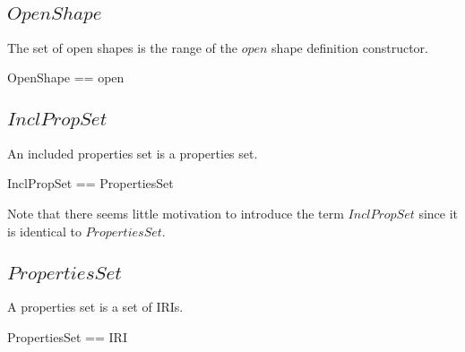 \documentclass{article}
\begin{document}
\subsection{$OpenShape$}
The set of open shapes is the range of the $open$ shape definition constructor.
\begin{zed}
	OpenShape == \ran open
\end{zed}

\subsection{$InclPropSet$}
An included properties set is a properties set.
\begin{zed}
	InclPropSet == PropertiesSet
\end{zed}
Note that there seems little motivation to introduce the term $InclPropSet$ since it is identical to $PropertiesSet$.

\subsection{$PropertiesSet$}
A properties set is a set of IRIs.
\begin{zed}
	PropertiesSet == \power IRI
\end{zed}
\end{document}
